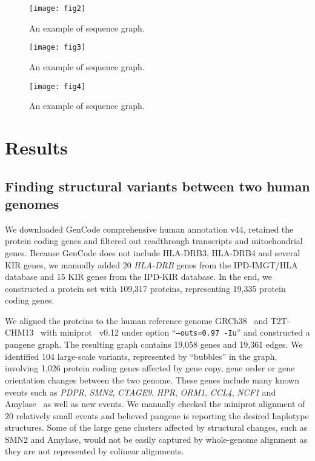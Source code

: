 \documentclass{bioinfo}
\begin{document}
\begin{methods}
\begin{figure}
\centering
\texttt{[image: fig2]}
\caption{An example of sequence graph.}
\end{figure}

\begin{figure}
\centering
\texttt{[image: fig3]}
\caption{An example of sequence graph.}
\end{figure}

\begin{figure}
\centering
\texttt{[image: fig4]}
\caption{An example of sequence graph.}
\end{figure}

\end{methods}

\section*{Results}

\subsection*{Finding structural variants between two human genomes}

We downloaded GenCode comprehensive human annotation v44,
retained the protein coding genes and filtered out readthrough transcripts and mitochondrial genes.
Because GenCode does not include HLA-DRB3, HLA-DRB4 and several KIR genes,
we manually added 20 {\it HLA-DRB} genes from the IPD-IMGT/HLA database and
15 KIR genes from the IPD-KIR database.
In the end, we constructed a protein set with 109,317 proteins, representing 19,335 protein coding genes.

We aligned the proteins to the human reference genome GRCh38~\citep{Schneider:2017aa} and T2T-CHM13~\citep{Nurk:2022up}
with miniprot~\citep{Li:2023ac} v0.12 under option ``{\tt --outs=0.97 -Iu}''
and constructed a pangene graph.
The resulting graph contains 19,058 genes and 19,361 edges.
We identified 104 large-scale variants, represented by ``bubbles'' in the graph,
involving 1,026 protein coding genes affected by gene copy, gene order or gene orientation changes between the two genome.
These genes include many known events such as {\it PDPR}, {\it SMN2}, {\it CTAGE9}, {\it HPR}, {\it ORM1}, {\it CCL4}, {\it NCF1} and Amylase~\citep{Handsaker:2015ur,Sudmant:2010aa}
as well as new events.
We manually checked the miniprot alignment of 20 relatively small events
and believed pangene is reporting the desired haplotype structures.
Some of the large gene clusters affected by structural changes, such as SMN2 and Amylase,
would not be easily captured by whole-genome alignment as they are not represented by colinear alignments.
\end{document}
